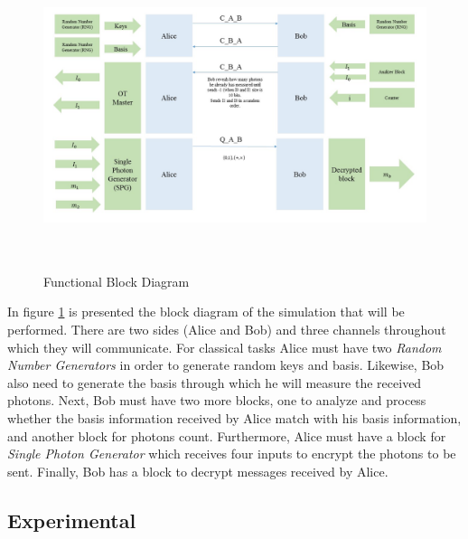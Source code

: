 \begin{figure}[h]
	\centering \includegraphics[width=1.1\textwidth,height=9cm]{./sdf/ot_with_discrete_variables/figures/DiagramBlock_Simulation.jpg}
	\caption{Functional Block Diagram}\label{functionalblockdiagram}
\end{figure}

In figure \ref{functionalblockdiagram} is presented the block diagram of the simulation that will be performed. There are two sides (Alice and Bob) and three channels throughout which they will communicate. For classical tasks Alice must have two \textit{Random Number Generators} in order to generate random keys and basis. Likewise, Bob also need to generate the basis through which he will measure the received photons. Next, Bob must have two more blocks, one to analyze and process whether the basis information received by Alice match with his basis information, and another block for photons count. Furthermore, Alice must have a block for \textit{Single Photon Generator} which receives four inputs to encrypt the photons to be sent. Finally, Bob has a block to decrypt messages received by Alice.

\subsection{Experimental}
